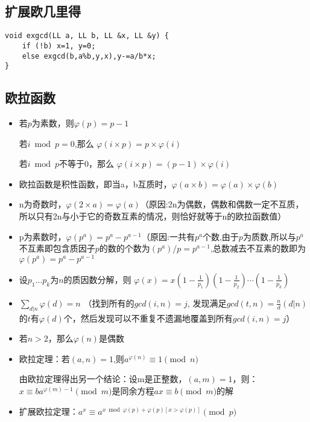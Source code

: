 \documentclass[twocolumn,a4]{article}
\begin{document}
\subsection{扩展欧几里得}
\begin{lstlisting}
void exgcd(LL a, LL b, LL &x, LL &y) {
	if (!b) x=1, y=0;
	else exgcd(b,a%b,y,x),y-=a/b*x;
}
\end{lstlisting}
\subsection{欧拉函数}
\begin{itemize}
\item 若$p$为素数，则$\varphi(p) = p - 1$

若$i \bmod p=0$,那么 $\varphi(i×p) = p×\varphi(i)$

若$i \bmod p$不等于0，那么 $\varphi(i×p) = (p-1)×\varphi(i)$

\item 欧拉函数是积性函数，即当a，b互质时，$\varphi(a×b) = \varphi(a)×\varphi(b)$

\item n为奇数时，$\varphi(2×a) = \varphi(a)$（原因:2n为偶数，偶数和偶数一定不互质，所以只有2n与小于它的奇数互素的情况，则恰好就等于n的欧拉函数值）

\item p为素数时，$\varphi(p^a) = p ^ a - p ^ {a - 1}$（原因:一共有$p^a$个数,由于$p$为质数,所以与$p^a$不互素即包含质因子$p$的数的个数为$(p^a)/p = p ^ {a - 1}$,总数减去不互素的数即为$\varphi(p ^ a) = p ^ a - p ^ {a - 1}$

\item 设$p_1\ldots p_k$为$n$的质因数分解，则 $\varphi(x)=x(1-\frac{1}{p_1})(1-\frac{1}{p_2})\cdots(1-\frac{1}{p_k})$

\item $\sum_{d|n}\varphi(d)=n$
（找到所有的$gcd(i, n)=j$, 发现满足$gcd(t,n)=\frac{n}{d} (d|n)$的$t$有$\varphi(d)个$，然后发现可以不重复不遗漏地覆盖到所有$gcd(i,n)=j$）

\item 若$n>2$，那么$\varphi(n)$是偶数

\item 欧拉定理：若$(a,n)=1$,则$a^{\varphi(n)}\equiv1\pmod n$

由欧拉定理得出另一个结论：设m是正整数，$(a,m)=1$，则：$x\equiv ba^{\varphi(m)-1}\pmod m$是同余方程$ax\equiv b\pmod m$的解

\item 扩展欧拉定理：$a^x \equiv a^{x\bmod \varphi(p)+\varphi(p)[x > \varphi(p)]} \pmod p$
\end{itemize}
\end{document}

